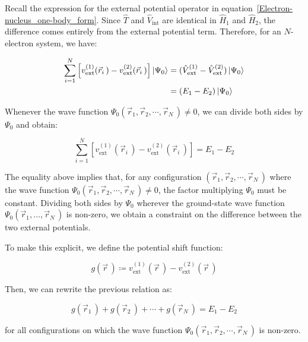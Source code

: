 Recall the expression for the external potential operator in equation~\eqref{Electron-nucleus_one-body_form}.
Since $\hat{T}$ and $\hat{V}_\mathrm{int}$ are identical in $\hat{H}_1$ and $\hat{H}_2$, the difference comes entirely from the external potential term.
Therefore, for an $N$-electron system, we have:

\begin{equation}
\begin{aligned}
    \sum_{i=1}^N\left[v_\mathrm{ext}^{(1)}(\vec{r}_i\,)-v_\mathrm{ext}^{(2)}(\vec{r}_i\,)\right]\ket{\Psi_0}
    &= (\hat{V}_\mathrm{ext}^{(1)}-\hat{V}_\mathrm{ext}^{(2)})\ket{\Psi_0} \\
    &= (E_1-E_2)\ket{\Psi_0}
\end{aligned}
\label{energy_difference}
\end{equation}

Whenever the wave function $\Psi_0(\vec{r}_1,\vec{r}_2,\cdots,\vec{r}_N\,)\neq 0$, we can divide both sides by $\Psi_0$ and obtain:

\begin{equation}
    \sum_{i=1}^N\left[v_\mathrm{ext}^{(1)}(\vec{r}_i\,)-v_\mathrm{ext}^{(2)}(\vec{r}_i\,)\right]=E_1-E_2
\label{difference_energy_nowave}
\end{equation}

The equality above implies that, for any configuration $(\vec{r}_1,\vec{r}_2,\cdots,\vec{r}_N\,)$ where the wave function $\Psi_0(\vec{r}_1,\vec{r}_2,\cdots,\vec{r}_N\,)\neq 0$, the factor multiplying $\Psi_0$ must be constant.
Dividing both sides by $\Psi_0$ wherever the ground-state wave function $\Psi_0(\vec{r}_1,\ldots,\vec{r}_N\,)$ is non-zero, we obtain a constraint on the difference between the two external potentials.

To make this explicit, we define the potential shift function:

\begin{equation}
    g(\vec{r}\,)\coloneqq v_\mathrm{ext}^{(1)}(\vec{r}\,)-v_\mathrm{ext}^{(2)}(\vec{r}\,)
\label{shift_potential}
\end{equation}

Then, we can rewrite the previous relation as:

\begin{equation}
    g(\vec{r}_1\,)+g(\vec{r}_2\,)+\cdots+g(\vec{r}_N\,)=E_1-E_2
\label{N-body_shift_potential}
\end{equation}

for all configurations on which the wave function $\Psi_0(\vec{r}_1,\vec{r}_2,\cdots,\vec{r}_N\,)$ is non-zero.

